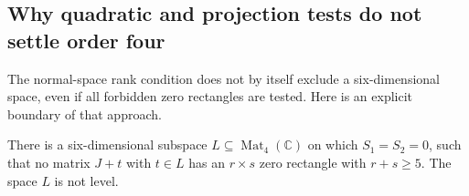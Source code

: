 \subsection{Why quadratic and projection tests do not settle order four}

The normal-space rank condition does not by itself exclude a six-dimensional
space, even if all forbidden zero rectangles are tested.  Here is an explicit
boundary of that approach.

\begin{proposition}\label{prop:quadratic-projection-boundary}
There is a six-dimensional subspace $L\subseteq\operatorname{Mat}_4(\mathbb C)$
on which $S_1=S_2=0$, such that no matrix $J+t$ with $t\in L$ has an
$r\times s$ zero rectangle with $r+s\geq5$.  The space $L$ is not level.
\end{proposition}

